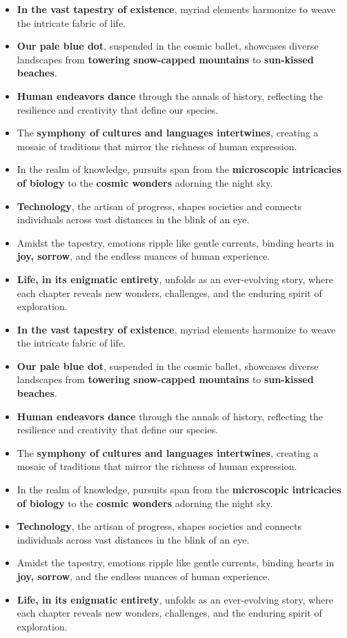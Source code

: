 \begin{itemize}
    \item \textbf{In the vast tapestry of existence}, myriad elements harmonize to weave the intricate fabric of life.
    \item \textbf{Our pale blue dot}, suspended in the cosmic ballet, showcases diverse landscapes from \textbf{towering snow-capped mountains} to \textbf{sun-kissed beaches}.
    \item \textbf{Human endeavors dance} through the annals of history, reflecting the resilience and creativity that define our species.
    \item The \textbf{symphony of cultures and languages intertwines}, creating a mosaic of traditions that mirror the richness of human expression.
    \item In the realm of knowledge, pursuits span from the \textbf{microscopic intricacies of biology} to the \textbf{cosmic wonders} adorning the night sky.
    \item \textbf{Technology}, the artisan of progress, shapes societies and connects individuals across vast distances in the blink of an eye.
    \item Amidst the tapestry, emotions ripple like gentle currents, binding hearts in \textbf{joy, sorrow}, and the endless nuances of human experience.
    \item \textbf{Life, in its enigmatic entirety}, unfolds as an ever-evolving story, where each chapter reveals new wonders, challenges, and the enduring spirit of exploration.
    \item \textbf{In the vast tapestry of existence}, myriad elements harmonize to weave the intricate fabric of life.
    \item \textbf{Our pale blue dot}, suspended in the cosmic ballet, showcases diverse landscapes from \textbf{towering snow-capped mountains} to \textbf{sun-kissed beaches}.
    \item \textbf{Human endeavors dance} through the annals of history, reflecting the resilience and creativity that define our species.
    \item The \textbf{symphony of cultures and languages intertwines}, creating a mosaic of traditions that mirror the richness of human expression.
    \item In the realm of knowledge, pursuits span from the \textbf{microscopic intricacies of biology} to the \textbf{cosmic wonders} adorning the night sky.
    \item \textbf{Technology}, the artisan of progress, shapes societies and connects individuals across vast distances in the blink of an eye.
    \item Amidst the tapestry, emotions ripple like gentle currents, binding hearts in \textbf{joy, sorrow}, and the endless nuances of human experience.
    \item \textbf{Life, in its enigmatic entirety}, unfolds as an ever-evolving story, where each chapter reveals new wonders, challenges, and the enduring spirit of exploration.
\end{itemize}


